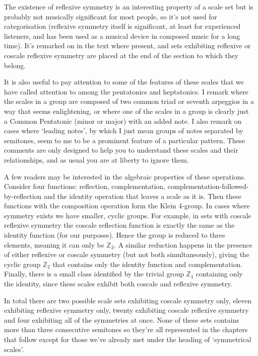 \documentclass[english]{./gbook}
\begin{document}
\begin{large}
The existence of reflexive symmetry is an interesting property of a scale set but is probably not musically significant for most people, so it's not used for categorisation (reflexive symmetry itself is significant, at least for experienced listeners, and has been used as a musical device in composed music for a long time). It's remarked on in the text where present, and sets exhibiting reflexive or coscale reflexive symmetry are placed at the end of the section to which they belong.

It is also useful to pay attention to some of the features of these scales that we have called attention to among the pentatonics and heptatonics. I remark where the scales in a group are composed of two common triad or seventh arpeggios in a way that seems enlightening, or where one of the scales in a group is clearly just a Common Pentatonic (minor or major) with an added note. I also remark on cases where `leading notes', by which I just mean groups of notes separated by semitones, seem to me to be a prominent feature of a particular pattern. These comments are only designed to help you to understand these scales and their relationships, and as usual you are at liberty to ignore them.

A few readers may be interested in the algebraic properties of these operations. Consider four functions: reflection, complementation, complementation-followed-by-reflection and the identity operation that leaves a scale as it is. Then these functions with the composition operation form the Klein 4-group. In cases where symmetry exists we have smaller, cyclic groups. For example, in sets with coscale reflexive symmetry the coscale reflection function is exactly the same as the identity function (for our purposes). Hence the group is reduced to three elements, meaning it can only be $\mathbb{Z}_3$. A similar reduction happens in the presence of either reflexive or coscale symmetry (but not both simultaneously), giving the cyclic group $\mathbb{Z}_2$ that contains only the identity function and complementation. Finally, there is a small class identified by the trivial group $\mathbb{Z}_1$ containing only the identity, since these scales exhibit both coscale and reflexive symmetry.

In total there are two possible scale sets exhibiting coscale symmetry only, eleven exhibiting reflexive symmetry only, twenty exhibiting coscale reflexive symmetry and four exhibiting all of the symmetries at once. None of these sets contains more than three consecutive semitones so they're all represented in the chapters that follow except for those we've already met under the heading of `symmetrical scales'.



\end{large}
\end{document}

